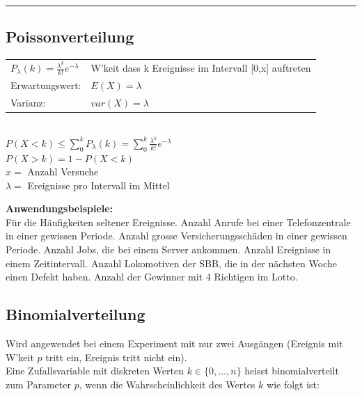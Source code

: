 \hrule \hspace{3mm}

	\subsection{Poissonverteilung \skript{\pageref{sk-section-poissonverteilung}}}
	\begin{multicols}{2}
		\begin{tabular}{ll}
        $P_\lambda(k)=\frac{\lambda^k}{k!}e^{-\lambda}$ &
         \parbox{4cm}{W'keit dass k Ereignisse im Intervall [0,x] auftreten} \\
        Erwartungswert:  & $E(X)=\lambda$\\
        Varianz:  & $var(X)=\lambda$ \\
        \end{tabular} \\
         $P(X<k) \leq \sum_0^k P_\lambda(k)=\sum_0^k \frac{\lambda^k}{k!}e^{-\lambda}$ \\
         $P(X>k) = 1-P(X<k)$ \\
        $x =$ Anzahl Versuche\\
        $\lambda =$ Ereignisse pro Intervall im Mittel
        \columnbreak
        
        {\bf Anwendungsbeispiele:} \\ Für die Häufigkeiten seltener
        Ereignisse. Anzahl Anrufe bei einer Telefonzentrale in einer gewissen
        Periode. Anzahl grosse Versicherungsschäden in einer gewissen Periode.
        Anzahl Jobs, die bei einem Server ankommen. Anzahl Ereignisse in
        einem Zeitintervall. Anzahl Lokomotiven der SBB, die in der nächsten Woche 
        einen Defekt haben. Anzahl der Gewinner mit 4 Richtigen im Lotto.
     \end{multicols}
        
\newpage
	\subsection{Binomialverteilung \skript{\pageref{sk-section-binomialverteilung}}}
		
    	Wird angewendet bei einem Experiment mit nur zwei Ausgängen (Ereignis mit W'keit $p$ tritt
    	ein, Ereignis tritt nicht ein). \\
    	Eine Zufallsvariable mit diskreten Werten $k \in \{
    	0,\ldots,n \}$ heisst binomialverteilt zum Parameter $p$, wenn die
        Wahrscheinlichkeit des Wertes $k$ wie folgt ist:

